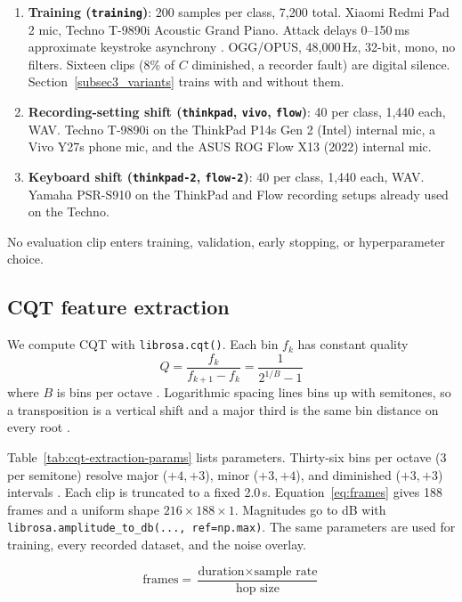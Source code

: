 \documentclass[pdflatex,sn-mathphys-num,iicol]{sn-jnl}
\theoremstyle{thmstyleone}
\theoremstyle{thmstyletwo}
\theoremstyle{thmstylethree}
\begin{document}
\begin{enumerate}[1.]
\item \textbf{Training (\texttt{training})}: 200 samples per class, 7{,}200 total. Xiaomi Redmi Pad 2 mic, Techno T-9890i Acoustic Grand Piano. Attack delays 0--150\,ms approximate keystroke asynchrony \cite{Bella2011}. OGG/OPUS, 48{,}000\,Hz, 32-bit, mono, no filters. Sixteen clips (8\% of $C$ diminished, a recorder fault) are digital silence. Section~\ref{subsec3_variants} trains with and without them.
\item \textbf{Recording-setting shift (\texttt{thinkpad}, \texttt{vivo}, \texttt{flow})}: 40 per class, 1{,}440 each, WAV. Techno T-9890i on the ThinkPad P14s Gen 2 (Intel) internal mic, a Vivo Y27s phone mic, and the ASUS ROG Flow X13 (2022) internal mic.
\item \textbf{Keyboard shift (\texttt{thinkpad-2}, \texttt{flow-2})}: 40 per class, 1{,}440 each, WAV. Yamaha PSR-S910 on the ThinkPad and Flow recording setups already used on the Techno.
\end{enumerate}

No evaluation clip enters training, validation, early stopping, or hyperparameter choice.

\subsection{CQT feature extraction}\label{subsec3_2}

We compute CQT with \texttt{librosa.cqt()}. Each bin $f_k$ has constant quality
\begin{equation}
Q = \frac{f_k}{f_{k+1} - f_k} = \frac{1}{2^{1/B} - 1}
\label{eq:cqt}
\end{equation}
where $B$ is bins per octave \cite{Li2021}\cite{Lacoste2007}. Logarithmic spacing lines bins up with semitones, so a transposition is a vertical shift and a major third is the same bin distance on every root \cite{Harte2010}.

Table~\ref{tab:cqt-extraction-params} lists parameters. Thirty-six bins per octave (3 per semitone) resolve major ($+4,+3$), minor ($+3,+4$), and diminished ($+3,+3$) intervals \cite{Akram2025}\cite{OHanlon2021}. Each clip is truncated to a fixed 2.0\,s. Equation~\ref{eq:frames} gives 188 frames and a uniform shape $216 \times 188 \times 1$. Magnitudes go to dB with \texttt{librosa.amplitude\_to\_db(..., ref=np.max)}. The same parameters are used for training, every recorded dataset, and the noise overlay.

\begin{equation}
\text{frames} = \frac{\text{duration} \times \text{sample rate}}{\text{hop size}}
\label{eq:frames}
\end{equation}
\end{document}
